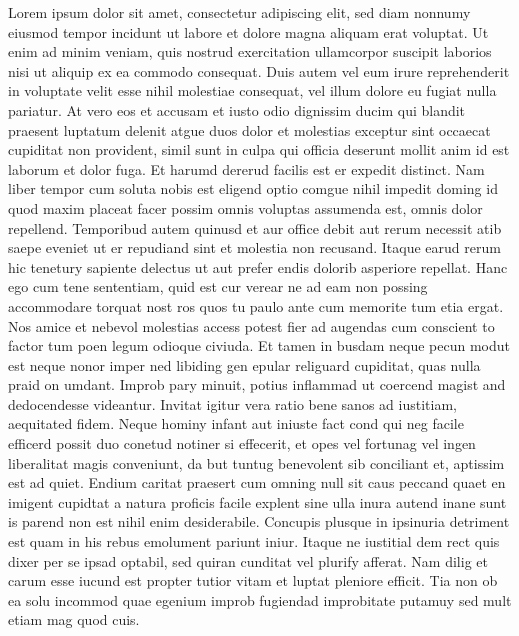 \noindent Lorem ipsum dolor sit amet, consectetur adipiscing elit, sed diam nonnumy eiusmod tempor incidunt ut labore et dolore magna aliquam erat voluptat. Ut enim ad minim veniam, quis nostrud exercitation ullamcorpor suscipit laborios nisi ut aliquip ex ea commodo consequat. Duis autem vel eum irure reprehenderit in voluptate velit esse nihil molestiae consequat, vel illum dolore eu fugiat nulla pariatur. At vero eos et accusam et iusto odio dignissim ducim qui blandit praesent luptatum delenit atgue duos dolor et molestias exceptur sint occaecat cupiditat non provident, simil sunt in culpa qui officia deserunt mollit anim id est laborum et dolor fuga. Et harumd dererud facilis est er expedit distinct. Nam liber tempor cum soluta nobis est eligend optio comgue nihil impedit doming id quod maxim placeat facer possim omnis voluptas assumenda est, omnis dolor repellend. Temporibud autem quinusd et aur office debit aut rerum necessit atib saepe eveniet ut er repudiand sint et molestia non recusand. Itaque earud rerum hic tenetury sapiente delectus ut aut prefer endis dolorib asperiore repellat. Hanc ego cum tene sententiam, quid est cur verear ne ad eam non possing accommodare torquat nost ros quos tu paulo ante cum memorite tum etia ergat. Nos amice et nebevol molestias access potest fier ad augendas cum conscient to factor tum poen legum odioque civiuda. Et tamen in busdam neque pecun modut est neque nonor imper ned libiding gen epular religuard cupiditat, quas nulla praid on umdant. Improb pary minuit, potius inflammad ut coercend magist and dedocendesse videantur. Invitat igitur vera ratio bene sanos ad iustitiam, aequitated fidem. Neque hominy infant aut iniuste fact cond qui neg facile efficerd possit duo conetud notiner si effecerit, et opes vel fortunag vel ingen liberalitat magis conveniunt, da but tuntug benevolent sib conciliant et, aptissim est ad quiet. Endium caritat praesert cum omning null sit caus peccand quaet en imigent cupidtat a natura proficis facile explent sine ulla inura autend inane sunt is parend non est nihil enim desiderabile. Concupis plusque in ipsinuria detriment est quam in his rebus emolument pariunt iniur. Itaque ne iustitial dem rect quis dixer per se ipsad optabil, sed quiran cunditat vel plurify afferat. Nam dilig et carum esse iucund est propter tutior vitam et luptat pleniore efficit. Tia non ob ea solu incommod quae egenium improb fugiendad improbitate putamuy sed mult etiam mag quod cuis. 
